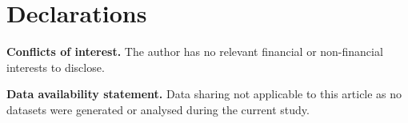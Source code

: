 \documentclass[reqno]{amsart}
\numberwithin{equation}{section}
\theoremstyle{plain}
\theoremstyle{definition}
\theoremstyle{remark}
\numberwithin{equation}{section}
\begin{document}
\section*{Declarations}
\noindent\textbf{Conflicts of interest.} The author has no relevant financial or non-financial interests to disclose.


\noindent\textbf{Data availability statement.} Data sharing not applicable to this article as no datasets were generated or
analysed during the current study.

\printbibliography
\end{document}
